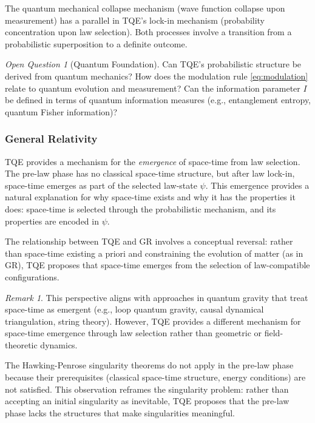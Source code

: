 \documentclass[12pt,a4paper]{article}
\theoremstyle{definition}
\theoremstyle{remark}
\newtheorem{remark}{Remark}[section]
\newtheorem{question}{Open Question}[section]
\begin{document}
The quantum mechanical collapse mechanism (wave function collapse upon measurement) has a parallel in TQE's lock-in mechanism (probability concentration upon law selection). Both processes involve a transition from a probabilistic superposition to a definite outcome.

\begin{question}[Quantum Foundation]
Can TQE's probabilistic structure be derived from quantum mechanics? How does the modulation rule \eqref{eq:modulation} relate to quantum evolution and measurement? Can the information parameter $I$ be defined in terms of quantum information measures (e.g., entanglement entropy, quantum Fisher information)?
\end{question}

\subsubsection{General Relativity}

TQE provides a mechanism for the \emph{emergence} of space-time from law selection. The pre-law phase has no classical space-time structure, but after law lock-in, space-time emerges as part of the selected law-state $\psi$. This emergence provides a natural explanation for why space-time exists and why it has the properties it does: space-time is selected through the probabilistic mechanism, and its properties are encoded in $\psi$.

The relationship between TQE and GR involves a conceptual reversal: rather than space-time existing a priori and constraining the evolution of matter (as in GR), TQE proposes that space-time emerges from the selection of law-compatible configurations.

\begin{remark}
This perspective aligns with approaches in quantum gravity that treat space-time as emergent (e.g., loop quantum gravity, causal dynamical triangulation, string theory). However, TQE provides a different mechanism for space-time emergence through law selection rather than geometric or field-theoretic dynamics.
\end{remark}

The Hawking-Penrose singularity theorems \cite{hawking1970singularities, penrose1965gravitational} do not apply in the pre-law phase because their prerequisites (classical space-time structure, energy conditions) are not satisfied. This observation reframes the singularity problem: rather than accepting an initial singularity as inevitable, TQE proposes that the pre-law phase lacks the structures that make singularities meaningful.
\end{document}
